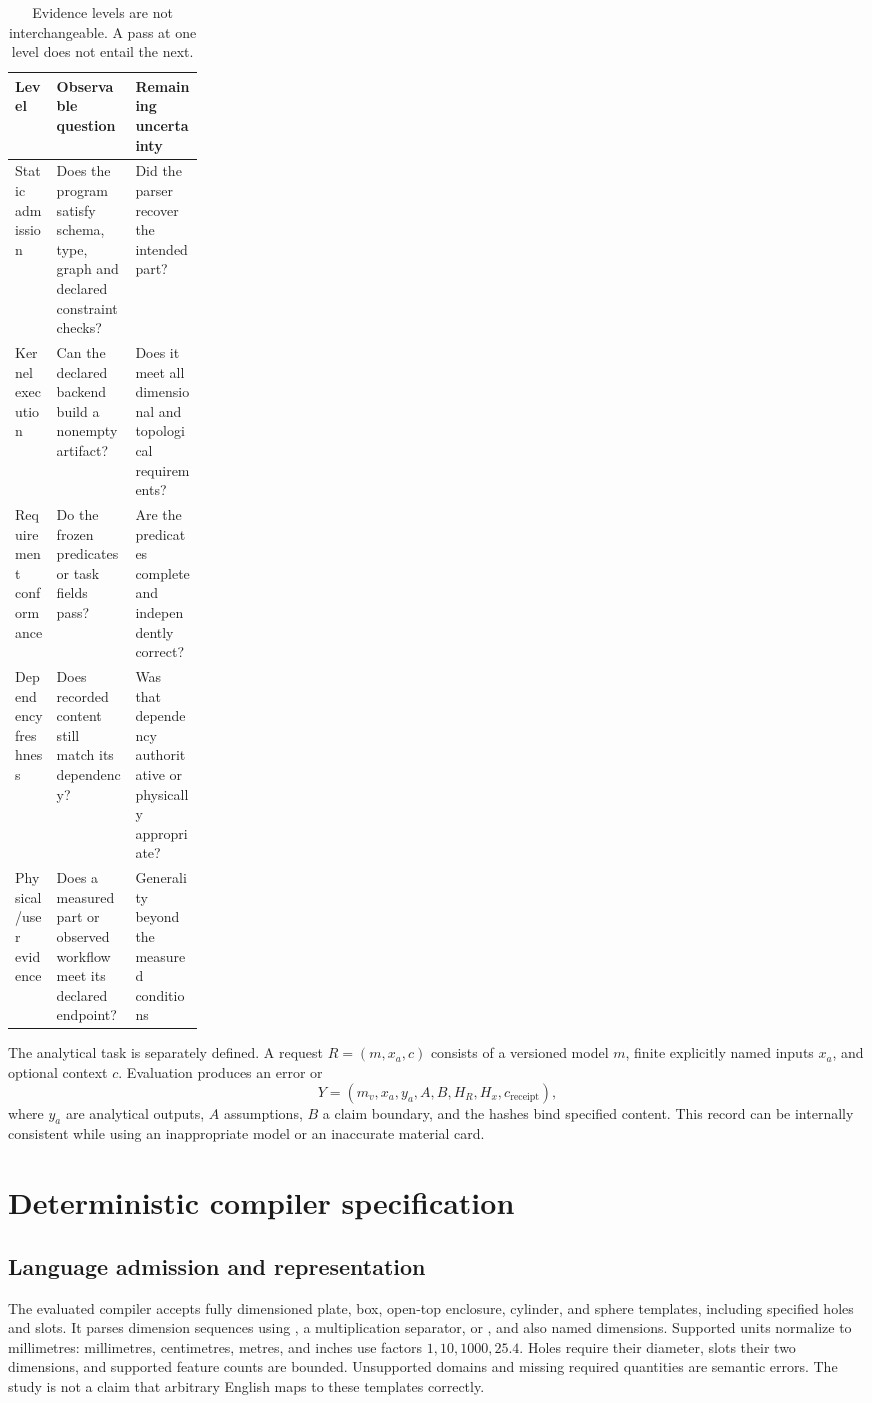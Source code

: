 \documentclass[10pt]{article}
\newcommand{\code}[1]{\texttt{\detokenize{#1}}}
\begin{document}
\begin{table}[t]
\centering
\caption{Evidence levels are not interchangeable. A pass at one level does
not entail the next.}
\label{tab:levels}
\small
\begin{tabularx}{\linewidth}{p{0.22\linewidth}XX}
\toprule
Level & Observable question & Remaining uncertainty \\
\midrule
Static admission & Does the program satisfy schema, type, graph and declared
constraint checks? & Did the parser recover the intended part? \\
Kernel execution & Can the declared backend build a nonempty artifact? &
Does it meet all dimensional and topological requirements? \\
Requirement conformance & Do the frozen predicates or task fields pass? &
Are the predicates complete and independently correct? \\
Dependency freshness & Does recorded content still match its dependency? &
Was that dependency authoritative or physically appropriate? \\
Physical/user evidence & Does a measured part or observed workflow meet its
declared endpoint? & Generality beyond the measured conditions \\
\bottomrule
\end{tabularx}
\end{table}

The analytical task is separately defined. A request
\(R=(m,x_a,c)\) consists of a versioned model \(m\), finite explicitly named
inputs \(x_a\), and optional context \(c\). Evaluation produces an error or
\begin{equation}
Y=(m_v,x_a,y_a,A,B,H_R,H_x,c_{\mathrm{receipt}}),
\end{equation}
where \(y_a\) are analytical outputs, \(A\) assumptions, \(B\) a claim boundary,
and the hashes bind specified content. This record can be internally
consistent while using an inappropriate model or an inaccurate material card.

\section{Deterministic compiler specification}

\subsection{Language admission and representation}

The evaluated compiler accepts fully dimensioned plate, box, open-top
enclosure, cylinder, and sphere templates, including specified holes and slots.
It parses dimension sequences using \code{x}, a multiplication separator, or
\code{by}, and also named dimensions. Supported units normalize to millimetres:
millimetres, centimetres, metres, and inches use factors \(1,10,1000,25.4\).
Holes require their diameter, slots their two dimensions, and supported feature
counts are bounded. Unsupported domains and missing required quantities are
semantic errors. The study is not a claim that arbitrary English maps to these
templates correctly.
\end{document}
